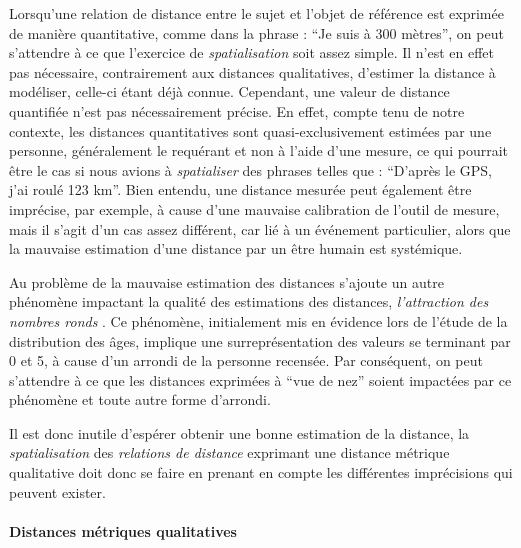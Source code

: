 Lorsqu'une relation de distance entre le sujet et l'objet de référence
est exprimée de manière quantitative, comme dans la phrase :
\enquote{Je suis à 300 mètres}, on peut s'attendre à ce que l'exercice
de \emph{spatialisation} soit assez simple. Il n'est en effet pas
nécessaire, contrairement aux distances qualitatives, d'estimer la
distance à modéliser, celle-ci étant déjà connue. Cependant, une
valeur de distance quantifiée n'est pas nécessairement précise. En
effet, compte tenu de notre contexte, les distances quantitatives sont
quasi-exclusivement estimées par une personne, généralement le
requérant et non à l'aide d'une mesure, ce qui pourrait être le cas si
nous avions à \emph{spatialiser} des phrases telles que :
\enquote{D'après le GPS, j'ai roulé 123 km}. Bien entendu, une
distance mesurée peut également être imprécise, par exemple, à cause
d'une mauvaise calibration de l'outil de mesure, mais il s'agit d'un
cas assez différent, car lié à un événement particulier, alors que la
mauvaise estimation d'une distance par un être humain est systémique.

Au problème de la mauvaise estimation des distances s'ajoute un autre
phénomène impactant la qualité des estimations des distances,
\emph{l'attraction des nombres ronds} \autocite{Durand1961}. Ce
phénomène, initialement mis en évidence lors de l'étude de la
distribution des âges, implique une surreprésentation des valeurs se
terminant par 0 et 5, à cause d'un arrondi de la personne
recensée. Par conséquent, on peut s'attendre à ce que les distances
exprimées à \enquote{vue de nez} soient impactées par ce phénomène et
toute autre forme d'arrondi.

Il est donc inutile d'espérer obtenir une bonne estimation de la
distance, la \emph{spatialisation} des \emph{relations de distance}
exprimant une distance métrique qualitative doit donc se faire en
prenant en compte les différentes imprécisions qui peuvent exister.

\paragraph{Distances métriques qualitatives}



